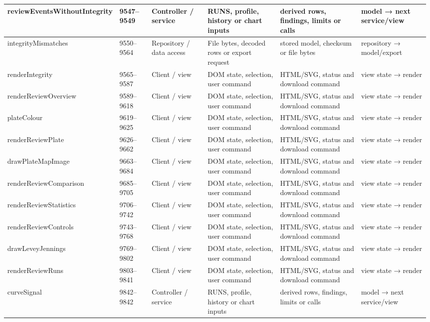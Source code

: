 \begin{landscape}
\begin{longtable}{@{}p{3.2cm}p{1.45cm}p{2.7cm}p{4.0cm}p{4.0cm}p{3.0cm}@{}}
reviewEventsWithoutIntegrity & 9547--9549 & Controller / service & RUNS, profile, history or chart inputs & derived rows, findings, limits or calls & model → next service/view \\\hline
integrityMismatches & 9550--9564 & Repository / data access & File bytes, decoded rows or export request & stored model, checksum or file bytes & repository → model/export \\\hline
renderIntegrity & 9565--9587 & Client / view & DOM state, selection, user command & HTML/SVG, status and download command & view state → render \\\hline
renderReviewOverview & 9589--9618 & Client / view & DOM state, selection, user command & HTML/SVG, status and download command & view state → render \\\hline
plateColour & 9619--9625 & Client / view & DOM state, selection, user command & HTML/SVG, status and download command & view state → render \\\hline
renderReviewPlate & 9626--9662 & Client / view & DOM state, selection, user command & HTML/SVG, status and download command & view state → render \\\hline
drawPlateMapImage & 9663--9684 & Client / view & DOM state, selection, user command & HTML/SVG, status and download command & view state → render \\\hline
renderReviewComparison & 9685--9705 & Client / view & DOM state, selection, user command & HTML/SVG, status and download command & view state → render \\\hline
renderReviewStatistics & 9706--9742 & Client / view & DOM state, selection, user command & HTML/SVG, status and download command & view state → render \\\hline
renderReviewControls & 9743--9768 & Client / view & DOM state, selection, user command & HTML/SVG, status and download command & view state → render \\\hline
drawLeveyJennings & 9769--9802 & Client / view & DOM state, selection, user command & HTML/SVG, status and download command & view state → render \\\hline
renderReviewRuns & 9803--9841 & Client / view & DOM state, selection, user command & HTML/SVG, status and download command & view state → render \\\hline
curveSignal & 9842--9842 & Controller / service & RUNS, profile, history or chart inputs & derived rows, findings, limits or calls & model → next service/view \\\hline

\end{longtable}
\end{landscape}
